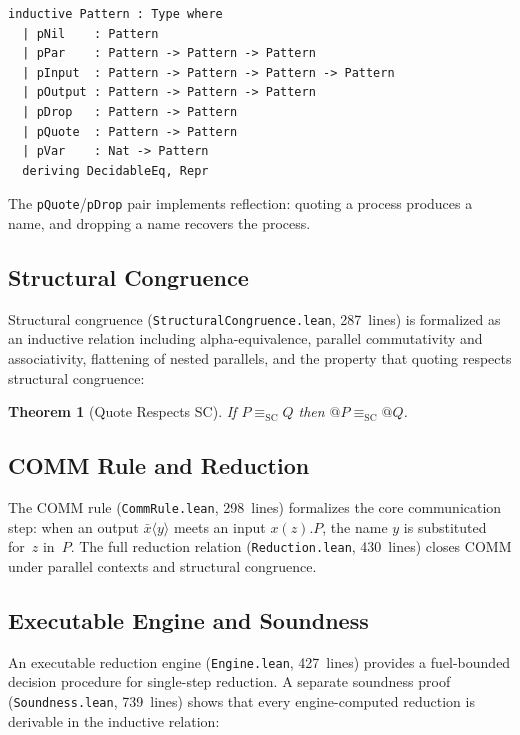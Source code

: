 \documentclass[11pt]{article}
\newtheorem{theorem}{Theorem}[section]
\theoremstyle{definition}
\theoremstyle{remark}
\begin{document}
\begin{lstlisting}[caption={Rho-calculus process syntax (from \texttt{Types.lean})}]
inductive Pattern : Type where
  | pNil    : Pattern
  | pPar    : Pattern -> Pattern -> Pattern
  | pInput  : Pattern -> Pattern -> Pattern -> Pattern
  | pOutput : Pattern -> Pattern -> Pattern
  | pDrop   : Pattern -> Pattern
  | pQuote  : Pattern -> Pattern
  | pVar    : Nat -> Pattern
  deriving DecidableEq, Repr
\end{lstlisting}

\noindent
The \texttt{pQuote}/\texttt{pDrop} pair implements reflection: quoting a
process produces a name, and dropping a name recovers the process.

\subsection{Structural Congruence}

Structural congruence (\texttt{StructuralCongruence.lean}, 287~lines)
is formalized as an inductive relation including alpha-equivalence,
parallel commutativity and associativity, flattening of nested parallels,
and the property that quoting respects structural congruence:

\begin{theorem}[Quote Respects SC]
If $P \equiv_{\mathrm{SC}} Q$ then $\mathsf{@}P \equiv_{\mathrm{SC}} \mathsf{@}Q$.
\end{theorem}

\subsection{COMM Rule and Reduction}

The COMM rule (\texttt{CommRule.lean}, 298~lines) formalizes the
core communication step: when an output $\bar{x}\langle y \rangle$
meets an input $x(z).P$, the name $y$ is substituted for~$z$ in~$P$.
The full reduction relation (\texttt{Reduction.lean}, 430~lines) closes
COMM under parallel contexts and structural congruence.

\subsection{Executable Engine and Soundness}

An executable reduction engine (\texttt{Engine.lean}, 427~lines)
provides a fuel-bounded decision procedure for single-step reduction.
A separate soundness proof (\texttt{Soundness.lean}, 739~lines) shows
that every engine-computed reduction is derivable in the inductive
relation:
\end{document}
